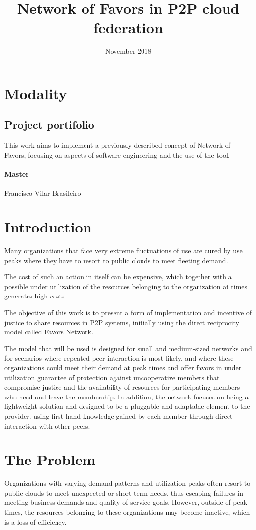 \documentclass{article}
\title{Network of Favors in P2P cloud federation}
\author{Gustavo Diniz Monteiro \\ \href{gustavo.monteiro@ccc.ufcg.edu.br, gustavo.d.monteiro@icloud.com} }
\date{November 2018}
\begin{document}
\maketitle

\section{Modality}

\subsection{Project portifolio}
This work aims to implement a previously described concept of Network of Favors, focusing on aspects of software engineering and the use of the tool.

\paragraph{Master} Francisco Vilar Brasileiro

\section{Introduction}
Many organizations that face very extreme fluctuations of use are cured by use peaks where they have to resort to public clouds to meet fleeting demand.

The cost of such an action in itself can be expensive, which together with a possible under utilization of the resources belonging to the organization at times generates high costs.

The objective of this work is to present a form of implementation and incentive of justice to share resources in P2P systems, initially using the direct reciprocity model called Favors Network.

The model that will be used is designed for small and medium-sized networks and for scenarios where repeated peer interaction is most likely, and where these organizations could meet their demand at peak times and offer favors in under utilization guarantee of protection against uncooperative members that compromise justice and the availability of resources for participating members who need and leave the membership. In addition, the network focuses on being a lightweight solution and designed to be a pluggable and adaptable element to the provider. using first-hand knowledge gained by each member through direct interaction with other peers.

\section{The Problem}
Organizations with varying demand patterns and utilization peaks often resort to public clouds to meet unexpected or short-term needs, thus escaping failures in meeting business demands and quality of service goals.
However, outside of peak times, the resources belonging to these organizations may become inactive, which is a loss of efficiency.
\end{document}
